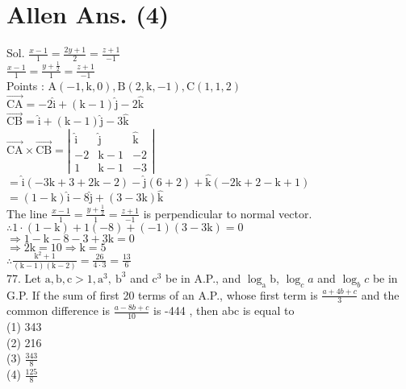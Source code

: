 \documentclass[10pt]{article}
\begin{document}
\section*{Allen Ans. (4)}
Sol. \(\frac{x-1}{1}=\frac{2 y+1}{2}=\frac{z+1}{-1}\)\\
\(\frac{x-1}{1}=\frac{y+\frac{1}{2}}{1}=\frac{z+1}{-1}\)\\
Points : \(\mathrm{A}(-1, \mathrm{k}, 0), \mathrm{B}(2, \mathrm{k},-1), \mathrm{C}(1,1,2)\)\\
\(\overrightarrow{\mathrm{CA}}=-2 \hat{\mathrm{i}}+(\mathrm{k}-1) \hat{\mathrm{j}}-2 \hat{\mathrm{k}}\)\\
\(\overrightarrow{\mathrm{CB}}=\hat{\mathrm{i}}+(\mathrm{k}-1) \hat{\mathrm{j}}-3 \hat{\mathrm{k}}\)\\
\(\overrightarrow{\mathrm{CA}} \times \overrightarrow{\mathrm{CB}}=\left|\begin{array}{ccc}\hat{\mathrm{i}} & \hat{\mathrm{j}} & \hat{\mathrm{k}} \\ -2 & \mathrm{k}-1 & -2 \\ 1 & \mathrm{k}-1 & -3\end{array}\right|\)\\
\(=\hat{\mathrm{i}}(-3 \mathrm{k}+3+2 \mathrm{k}-2)-\hat{\mathrm{j}}(6+2)+\hat{\mathrm{k}}(-2 \mathrm{k}+2-\mathrm{k}+1)\)\\
\(=(1-\mathrm{k}) \hat{\mathrm{i}}-8 \hat{\mathrm{j}}+(3-3 \mathrm{k}) \hat{\mathrm{k}}\)\\
The line \(\frac{x-1}{1}=\frac{y+\frac{1}{2}}{1}=\frac{z+1}{-1}\) is perpendicular to normal vector.\\
\(\therefore 1 \cdot(1-\mathrm{k})+1(-8)+(-1)(3-3 \mathrm{k})=0\)\\
\(\Rightarrow 1-\mathrm{k}-8-3+3 \mathrm{k}=0\)\\
\(\Rightarrow 2 \mathrm{k}=10 \Rightarrow \mathrm{k}=5\)\\
\(\therefore \frac{\mathrm{k}^{2}+1}{(\mathrm{k}-1)(\mathrm{k}-2)}=\frac{26}{4 \cdot 3}=\frac{13}{6}\)\\
77. Let \(\mathrm{a}, \mathrm{b}, \mathrm{c}>1, \mathrm{a}^{3}, \mathrm{~b}^{3}\) and \(\mathrm{c}^{3}\) be in A.P., and \(\log _{\mathrm{a}} \mathrm{b}\), \(\log _{c} a\) and \(\log _{b} c\) be in G.P. If the sum of first 20 terms of an A.P., whose first term is \(\frac{a+4 b+c}{3}\) and the common difference is \(\frac{a-8 b+c}{10}\) is -444 , then abc is equal to\\
(1) 343\\
(2) 216\\
(3) \(\frac{343}{8}\)\\
(4) \(\frac{125}{8}\)
\end{document}
